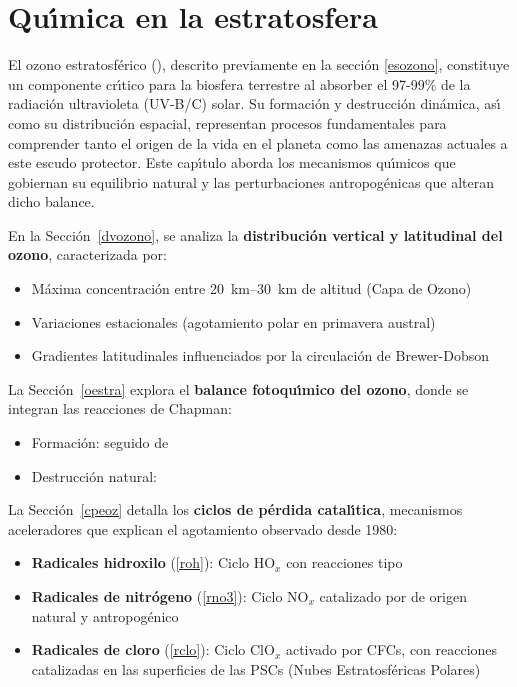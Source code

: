 %  
%  

\chapter[Quimica en la estratosfera]{Qu\'{\i}mica en la estratosfera}
\label{c:estrato}

El ozono estratosf\'erico (), descrito previamente en la secci\'on \ref{esozono}, constituye un componente cr\'{\i}tico para la biosfera terrestre al absorber el 97-99\% de la radiaci\'on ultravioleta (UV-B/C) solar. Su formaci\'on y destrucci\'on din\'amica, as\'{\i} como su distribuci\'on espacial, representan procesos fundamentales para comprender tanto el origen de la vida en el planeta como las amenazas actuales a este escudo protector. Este cap\'{\i}tulo aborda los mecanismos qu\'{\i}micos que gobiernan su equilibrio natural y las perturbaciones antropog\'enicas que alteran dicho balance.

En la  Secci\'on~\ref{dvozono}, se analiza la \textbf{distribuci\'on vertical y latitudinal del ozono}, caracterizada por:
\begin{itemize}
    \item M\'axima concentraci\'on entre \SIrange{20}{30}{\kilo\metre}  de altitud (Capa de Ozono)
    \item Variaciones estacionales (agotamiento polar en primavera austral)
    \item Gradientes latitudinales influenciados por la circulaci\'on de Brewer-Dobson
\end{itemize}

La Secci\'on~\ref{oestra} explora el \textbf{balance fotoqu\'{\i}mico del ozono}, donde se integran las reacciones de Chapman:
\begin{itemize}
    \item Formaci\'on:  seguido de 
    \item Destrucci\'on natural:  
\end{itemize}

La Secci\'on~\ref{cpeoz} detalla los \textbf{ciclos de p\'erdida catal\'{\i}tica}, mecanismos aceleradores que explican el agotamiento observado desde 1980:
\begin{itemize}
    \item \textbf{Radicales hidroxilo} (\ref{roh}): Ciclo HO$_x$ con reacciones tipo 
    \item \textbf{Radicales de nitr\'ogeno} (\ref{rno3}): Ciclo NO$_x$ catalizado por  de origen natural y antropog\'enico
    \item \textbf{Radicales de cloro} (\ref{rclo}): Ciclo ClO$_x$ activado por CFCs, con reacciones catalizadas en las superficies de las \gls{PSC}s (Nubes Estratosf\'ericas Polares)
\end{itemize}

